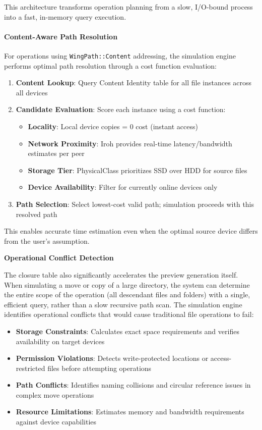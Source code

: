 \documentclass[sigconf]{acmart}
\begin{document}
This architecture transforms operation planning from a slow, I/O-bound process into a fast, in-memory query execution.

\paragraph{Content-Aware Path Resolution}

For operations using \texttt{WingPath::Content} addressing, the simulation engine performs optimal path resolution through a cost function evaluation:

\begin{enumerate}[noitemsep, topsep=0pt]
 \item \textbf{Content Lookup}: Query Content Identity table for all file instances across all devices
 \item \textbf{Candidate Evaluation}: Score each instance using a cost function:
   \begin{itemize}[noitemsep]
     \item \textbf{Locality}: Local device copies = 0 cost (instant access)
     \item \textbf{Network Proximity}: Iroh provides real-time latency/bandwidth estimates per peer
     \item \textbf{Storage Tier}: PhysicalClass prioritizes SSD over HDD for source files
     \item \textbf{Device Availability}: Filter for currently online devices only
   \end{itemize}
 \item \textbf{Path Selection}: Select lowest-cost valid path; simulation proceeds with this resolved path
\end{enumerate}

This enables accurate time estimation even when the optimal source device differs from the user's assumption.

\textbf{Operational Conflict Detection}

The closure table also significantly accelerates the preview generation itself. When simulating a move or copy of a large directory, the system can determine the entire scope of the operation (all descendant files and folders) with a single, efficient query, rather than a slow recursive path scan. The simulation engine identifies operational conflicts that would cause traditional file operations to fail:
\begin{itemize}[noitemsep, topsep=0pt]
\item \textbf{Storage Constraints}: Calculates exact space requirements and verifies availability on target devices
\item \textbf{Permission Violations}: Detects write-protected locations or access-restricted files before attempting operations
\item \textbf{Path Conflicts}: Identifies naming collisions and circular reference issues in complex move operations
\item \textbf{Resource Limitations}: Estimates memory and bandwidth requirements against device capabilities
\end{itemize}
\end{document}
